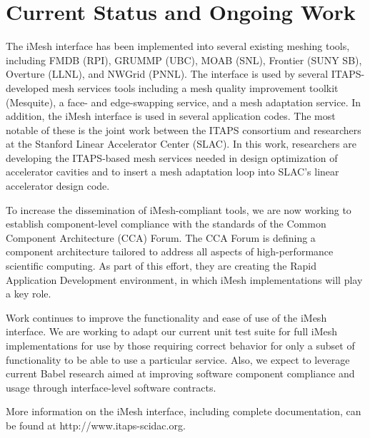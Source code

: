 
\section{Current Status and Ongoing Work\label{sec:Conclusions}}

The iMesh interface has been implemented into several existing
meshing tools, including FMDB (RPI), GRUMMP (UBC), MOAB (SNL), Frontier
(SUNY SB), Overture (LLNL), and NWGrid (PNNL).  The interface is used by
several ITAPS-developed mesh services tools including a mesh quality
improvement toolkit (Mesquite)\cite{Mesquite03}, a face- and
edge-swapping service\cite{TSTT-swap-tool}, and a mesh adaptation service.  In
addition, the iMesh interface is used in several
application codes.  The most notable of these is the joint work between
the ITAPS consortium and researchers at the Stanford Linear Accelerator
Center (SLAC).  In this work, researchers are developing the ITAPS-based
mesh services needed in design optimization of accelerator cavities and
to insert a mesh adaptation loop into SLAC's linear accelerator design
code\cite{GeLe04}.

To increase the dissemination of iMesh-compliant tools, we are now
working to establish component-level compliance with the standards of
the Common Component Architecture (CCA) Forum\cite{cca-forum}.  The CCA
Forum is defining a component architecture tailored to address all
aspects of high-performance scientific computing.  As part of this
effort, they are creating the Rapid Application Development environment,
in which iMesh implementations will play a key role.

Work continues to improve the functionality and ease of use of the iMesh
interface.  We are working to adapt our current unit test suite for full
iMesh implementations for use by those requiring correct behavior for
only a subset of functionality to be able to use a particular service.
Also, we expect to leverage current Babel research aimed at improving
software component compliance and usage through interface-level software
contracts\cite{dahlgren:sehpcs04,dahlgren:study04,dahlgren:sehpcs05}.

More information on the iMesh interface, including complete documentation,
can be found at http://www.itaps-scidac.org.

